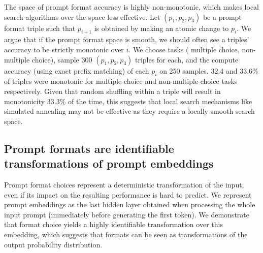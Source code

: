 \documentclass{article} %
\newcommand{\tbdone}[1]{}
\renewcommand{\tbdone}[1]{{\color{black}{#1}}}  %
\begin{document}
The space of prompt format accuracy is highly non-monotonic, which makes local search algorithms over the space less effective.
Let $(p_1, p_2, p_3)$ be a prompt format triple such that $p_{i+1}$ is obtained by making an atomic change to $p_{i}$. 
We argue that if the prompt format space is smooth, we should often see a triples' accuracy to be strictly monotonic over $i$. %
We choose \tbdone{24} tasks (\tbdone{13} multiple choice, \tbdone{11} non-multiple choice), sample 300 $(p_1, p_2, p_3)$ triples for each, and the compute accuracy (using exact prefix matching) of each $p_i$ on 250 samples. 
32.4 and 33.6\% of triples were monotonic for multiple-choice and non-multiple-choice tasks respectively.
Given that random shuffling within a triple will result in monotonicity  33.3\% of the time, this suggests that local search mechanisms like simulated annealing may not be effective as they require a locally smooth search space. %



\subsection{%
Prompt formats are identifiable transformations of prompt embeddings
}\label{sec:pca}

Prompt format choices represent a deterministic transformation of the input, even if its impact on the resulting performance is hard to predict. 
We represent prompt embeddings as the last hidden layer obtained when processing the whole input prompt (immediately before generating the first token).
We demonstrate that format choice yields a highly identifiable transformation over this embedding, which suggests that formats can be seen as transformations of the output probability distribution. %
\end{document}
